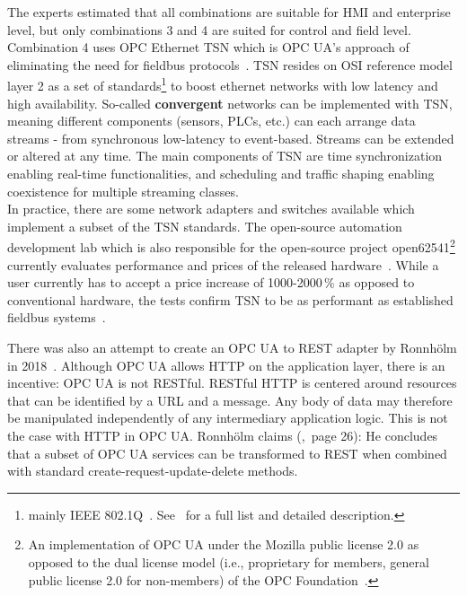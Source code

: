 The experts estimated that all combinations are suitable for HMI and enterprise level, but only combinations 3 and 4 are suited for control and field level. Combination 4 uses OPC Ethernet TSN which is OPC UA's approach of eliminating the need for fieldbus protocols~\cite{Wilmes2019ZauberwortKonvergenz}. TSN resides on OSI reference model layer 2 as a set of standards\footnote{mainly IEEE 802.1Q~\cite{2018IEEENetworks}. See~\cite{Bruckner2019AnSystems} for a full list and detailed description.} to boost ethernet networks with low latency and high availability. So-called \textbf{convergent} networks can be implemented with TSN, meaning different components (sensors, PLCs, etc.) can each arrange data streams - from synchronous low-latency to event-based. Streams can be extended or altered at any time. The main components of TSN are time synchronization enabling real-time functionalities, and scheduling and traffic shaping enabling coexistence for multiple streaming classes. \\
In practice, there are some network adapters and switches available which implement a subset of the TSN standards. The open-source automation development lab which is also responsible for the open-source project open62541\footnote{An implementation of OPC UA under the Mozilla public license 2.0 as opposed to the dual license model (i.e., proprietary for members, general public license 2.0 for non-members) of the OPC Foundation~\cite{Emde2019DieLizenzen}.} currently evaluates performance and prices of the released hardware~\cite{Emde2019DieLizenzen}. While a user currently has to accept a price increase of 1000-2000\,\% as opposed to conventional hardware, the tests confirm TSN to be as performant as established fieldbus systems~\cite{Emde2019DieLizenzen}.

There was also an attempt to create an OPC UA to REST adapter by Ronnhölm in 2018~\cite{Ronnholm2018IntegrationThesis}. Although OPC UA allows HTTP on the application layer, there is an incentive: OPC UA is not RESTful. RESTful HTTP is centered around resources that can be identified by a URL and a message. Any body of data may therefore be manipulated independently of any intermediary application logic. This is not the case with HTTP in OPC UA. Ronnhölm claims (\cite{Ronnholm2018IntegrationThesis},~page 26):  He concludes that a subset of OPC UA services can be transformed to REST when combined with standard create-request-update-delete methods.

